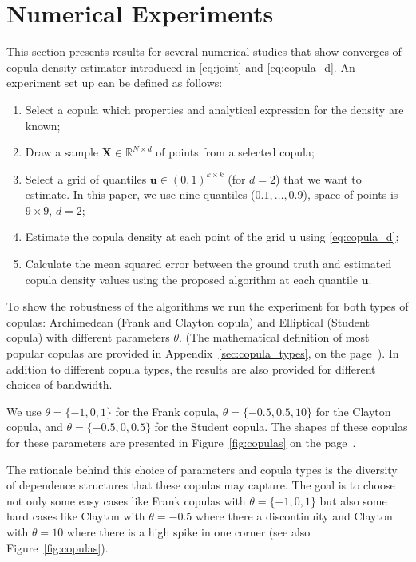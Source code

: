 \documentclass[12pt]{article}
\begin{document}
	\section{Numerical Experiments}
	
	This section presents results for several numerical studies that show converges of copula density estimator introduced in \eqref{eq:joint} and \eqref{eq:copula_d}. An experiment set up can be defined as follows:
	\begin{enumerate}
		\item Select a copula which properties and analytical expression for the density are known;
		\item Draw a sample $ \mathbf{X}\in\mathbb{R}^{N\times d} $ of points from a selected copula;
		\item Select a grid of quantiles $ \mathbf{u}\in(0, 1)^{k\times k} $ (for $ d=2 $) that we want to estimate. In this paper, we use nine quantiles ($ 0.1, \dots, 0.9 $), space of points is $ 9\times 9 $, $ d=2 $;
		\item Estimate the copula density at each point of the grid $ \mathbf{u} $ using \eqref{eq:copula_d};
		\item Calculate the mean squared error between the ground truth and estimated copula density values using the proposed algorithm at each quantile $ \mathbf{u} $.
	\end{enumerate}
	
	To show the robustness of the algorithms we run the experiment for both types of copulas: Archimedean (Frank and Clayton copula) and Elliptical (Student copula) with different parameters $ \theta $. (The mathematical definition of most popular copulas are provided in Appendix~\ref{sec:copula_types}, on the page~\pageref{sec:copula_types}). In addition to different copula types, the results are also provided for different choices of bandwidth.
	
	We use $ \theta = \{-1, 0, 1\} $ for the Frank copula, $ \theta = \{-0.5, 0.5, 10\} $ for the Clayton copula, and $ \theta = \{-0.5, 0, 0.5\} $ for the Student copula. The shapes of these copulas for these parameters are presented in Figure~\ref{fig:copulas} on the page~\pageref{fig:copulas}.
	
	The rationale behind this choice of parameters and copula types is the diversity of dependence structures that these copulas may capture. The goal is to choose not only some easy cases like Frank copulas with $ \theta = \{-1, 0, 1\} $ but also some hard cases like Clayton with $ \theta = -0.5 $ where there a discontinuity and Clayton with $ \theta = 10 $ where there is a high spike in one corner (see also Figure~\ref{fig:copulas}).
	
\end{document}

